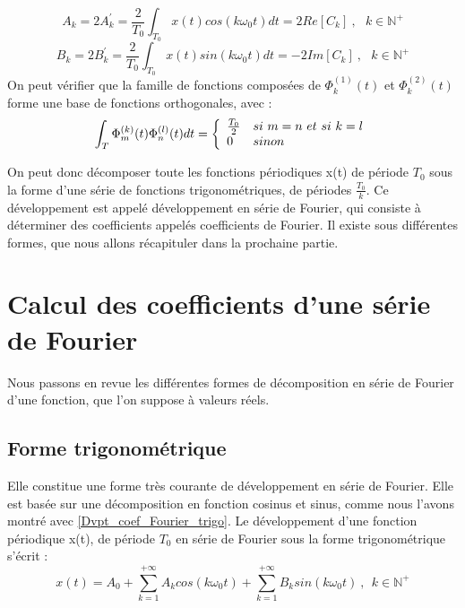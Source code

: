 	\begin{equation}\label{Calcul_coef_Fourier_trigo_2}
	A_{k}=2A_{k}^{'}=\frac{2}{T_{0}}\int_{T_{0}}x(t)cos(k\omega_{0}t)dt=2Re[C_{k}]~,~~~k \in \mathbb{N}^{+}
	\end{equation}
	\begin{equation}\label{Calcul_coef_Fourier_trigo_3}
	B_{k}=2B_{k}^{'}=\frac{2}{T_{0}}\int_{T_{0}}x(t)sin(k\omega_{0}t)dt=-2Im[C_{k}]~,~~~k \in \mathbb{N}^{+}
	\end{equation}
	On peut vérifier que la famille de fonctions composées de $\Phi_{k}^{(1)}(t)$ et $\Phi_{k}^{(2)}(t)$ forme une base de fonctions orthogonales, avec :
	\begin{equation}\label{}
	\int_{T}\Phi_{m}^{(k)}(t)\Phi_{n}^{(l)}(t)dt=\left \{
	\begin{array}{l l}
	\frac{T_{0}}{2}   & si~m=n~et~si~k=l \\
	0   & sinon \\
	\end{array}
	\right .
	\end{equation}
	
	
	

	
	On peut donc décomposer toute les fonctions périodiques x(t) de période $T_{0}$ sous la forme d'une série de fonctions trigonométriques, de périodes  $\frac{T_{0}}{k}$. Ce développement est appelé développement en série de Fourier, qui consiste à déterminer des coefficients appelés coefficients de Fourier. Il existe sous différentes formes, que nous allons récapituler dans la prochaine partie.

	
	
	\section{Calcul des coefficients d'une série de Fourier}	
	
	Nous passons en revue les différentes formes de décomposition en série de Fourier d'une fonction, que l'on suppose à valeurs réels.
	
	\subsection{Forme trigonométrique}
	Elle constitue une forme très courante de développement en série de Fourier. Elle est basée sur une décomposition en fonction cosinus et sinus, comme nous l'avons montré avec \ref{Dvpt_coef_Fourier_trigo}. Le développement d'une fonction périodique x(t), de période $T_{0}$ en série de Fourier sous la forme trigonométrique s'écrit :
	\begin{equation}\label{Serie_Fourier_Trigo}
	x(t)=A_{0}+\sum_{k=1}^{+\infty}A_{k}cos(k\omega_{0}t)+\sum_{k=1}^{+\infty}B_{k}sin(k\omega_{0}t)~,~~k \in \mathbb{N^{+}}
	\end{equation}
	
